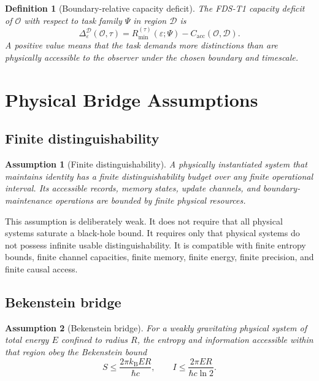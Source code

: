 \documentclass[10pt,a4paper,twocolumn,aps,prl]{revtex4-2}
\newtheorem{definition}{Definition}
\newtheorem{assumption}{Assumption}
\newcommand{\Obs}{\mathcal{O}}
\newcommand{\Patch}{\mathcal{D}}
\newcommand{\kB}{k_{\mathrm B}}
\begin{document}
\begin{definition}[Boundary-relative capacity deficit]
The FDS-T1 capacity deficit of $\Obs$ with respect to task family $\Psi$ in region $\Patch$ is
\begin{equation}
\Delta_{\varepsilon}^{\Patch}(\Obs,\tau)=R_{\min}^{(\tau)}(\varepsilon;\Psi)-C_{\mathrm{acc}}(\Obs,\Patch).
\label{eq:physical-deficit}
\end{equation}
A positive value means that the task demands more distinctions than are physically accessible to the observer under the chosen boundary and timescale.
\end{definition}

\section{Physical Bridge Assumptions}

\subsection{Finite distinguishability}

\begin{assumption}[Finite distinguishability]
A physically instantiated system that maintains identity has a finite distinguishability budget over any finite operational interval. Its accessible records, memory states, update channels, and boundary-maintenance operations are bounded by finite physical resources.
\end{assumption}

This assumption is deliberately weak. It does not require that all physical systems saturate a black-hole bound. It requires only that physical systems do not possess infinite usable distinguishability. It is compatible with finite entropy bounds, finite channel capacities, finite memory, finite energy, finite precision, and finite causal access.

\subsection{Bekenstein bridge}

\begin{assumption}[Bekenstein bridge]
For a weakly gravitating physical system of total energy $E$ confined to radius $R$, the entropy and information accessible within that region obey the Bekenstein bound
\begin{equation}
S\leq \frac{2\pi \kB E R}{\hbar c},\qquad
I\leq \frac{2\pi E R}{\hbar c\ln 2}.
\end{equation}
\end{assumption}
\end{document}

